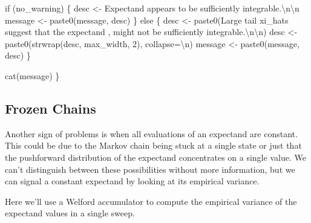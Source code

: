 \documentclass[
  letterpaper,
  DIV=11,
  numbers=noendperiod]{scrartcl}
\newenvironment{Shaded}{\begin{snugshade}}{\end{snugshade}}
\newcommand{\CharTok}[1]{\textcolor[rgb]{0.13,0.47,0.30}{#1}}
\newcommand{\ControlFlowTok}[1]{\textcolor[rgb]{0.00,0.23,0.31}{#1}}
\newcommand{\DecValTok}[1]{\textcolor[rgb]{0.68,0.00,0.00}{#1}}
\newcommand{\NormalTok}[1]{\textcolor[rgb]{0.00,0.23,0.31}{#1}}
\newcommand{\OperatorTok}[1]{\textcolor[rgb]{0.37,0.37,0.37}{#1}}
\newcommand{\StringTok}[1]{\textcolor[rgb]{0.13,0.47,0.30}{#1}}
\begin{document}
\begin{Shaded}
\begin{Highlighting}[]
  \ControlFlowTok{if}\NormalTok{ (no\_warning) \{}
\NormalTok{    desc }\OperatorTok{\textless{}{-}} \StringTok{\textquotesingle{}Expectand appears to be sufficiently integrable.}\CharTok{\textbackslash{}n\textbackslash{}n}\StringTok{\textquotesingle{}}
\NormalTok{    message }\OperatorTok{\textless{}{-}}\NormalTok{ paste0(message, desc)}
\NormalTok{  \} }\ControlFlowTok{else}\NormalTok{ \{}
\NormalTok{    desc }\OperatorTok{\textless{}{-}}\NormalTok{ paste0(}\StringTok{\textquotesingle{}Large tail xi\_hats suggest that the expectand \textquotesingle{}}\NormalTok{,}
                   \StringTok{\textquotesingle{}might not be sufficiently integrable.}\CharTok{\textbackslash{}n\textbackslash{}n}\StringTok{\textquotesingle{}}\NormalTok{)}
\NormalTok{    desc }\OperatorTok{\textless{}{-}}\NormalTok{ paste0(strwrap(desc, max\_width, }\DecValTok{2}\NormalTok{), collapse}\OperatorTok{=}\StringTok{\textquotesingle{}}\CharTok{\textbackslash{}n}\StringTok{\textquotesingle{}}\NormalTok{)}
\NormalTok{    message }\OperatorTok{\textless{}{-}}\NormalTok{ paste0(message, desc)}
\NormalTok{  \}}
  
\NormalTok{  cat(message)}
\NormalTok{\}}
\end{Highlighting}
\end{Shaded}

\subsection{Frozen Chains}\label{frozen-chains}

Another sign of problems is when all evaluations of an expectand are
constant. This could be due to the Markov chain being stuck at a single
state or just that the pushforward distribution of the expectand
concentrates on a single value. We can't distinguish between these
possibilities without more information, but we can signal a constant
expectand by looking at its empirical variance.

Here we'll use a Welford accumulator to compute the empirical variance
of the expectand values in a single sweep.
\end{document}
